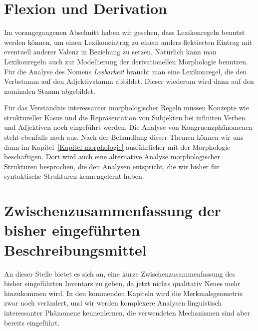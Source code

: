 \section{Flexion und Derivation}
\label{sec-lexikon-felx-deriv}

%
%
Im vorangegangenen Abschnitt haben wir gesehen, dass Lexikonregeln benutzt werden können, um einen
Lexikoneintrag zu einem anders flektierten Eintrag mit eventuell anderer Valenz in Beziehung zu setzen.
Natürlich kann man Lexikonregeln auch zur Modellierung der derivationellen Morphologie benutzen.
Für die Analyse des Nomens \emph{Lesbarkeit} braucht man eine Lexikonregel, die den Verbstamm
 auf den Adjektivstamm  abbildet. Dieser wiederum wird dann auf den nominalen
Stamm  abgebildet.

Für das Verständnis interessanter morphologischer Regeln müssen Konzepte wie struktureller Kasus
und die Repräsentation von Subjekten bei infiniten Verben und Adjektiven noch eingeführt werden.
Die Analyse von Kongruenzphänomenen steht ebenfalls noch aus. Nach der Behandlung dieser Themen
können wir uns dann im Kapitel~\ref{Kapitel-morphologie} ausführlicher mit der Morphologie beschäftigen.
Dort wird auch eine alternative Analyse morphologischer Strukturen besprochen, die den Analysen
entspricht, die wir bisher für syntaktische Strukturen kennengelernt haben.%
%
%

\section{Zwischenzusammenfassung der bisher eingeführten Beschreibungsmittel}

An dieser Stelle bietet es sich an, eine kurze Zwischenzusammenfassung des bisher eingeführten
Inventars zu geben, da jetzt nichts qualitativ Neues mehr hinzukommen wird. In den kommenden
Kapiteln wird die Merkmalsgeometrie zwar noch verändert, und wir werden komplexere Analysen
linguistisch interessanter Phänomene kennenlernen, die verwendeten Mechanismen sind aber
bereits eingeführt. 


